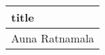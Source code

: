 \begin{longtable}[]{@{}l@{}}
\toprule
title \\
\midrule
\endhead
Auna Ratnamala \\
\bottomrule
\end{longtable}
